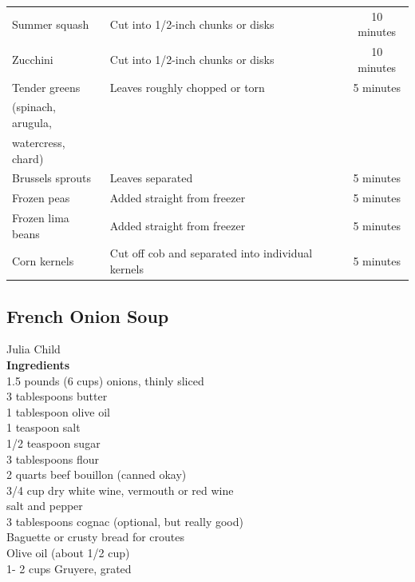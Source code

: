 \documentclass{article}
\numberwithin{figure}{section}
\numberwithin{equation}{section}
\begin{document}
\begin{table}[h!]
\begin{center}
\begin{tabular}{l|l|c}
      Summer squash & Cut into 1/2-inch chunks or disks	& 10 minutes\\
      Zucchini & Cut into 1/2-inch chunks or disks	& 10 minutes\\
      Tender greens	& Leaves roughly chopped or torn & 5 minutes\\ (spinach, arugula,&&\\ watercress, chard)&&\\
      Brussels sprouts & Leaves separated	 & 5 minutes\\
      Frozen peas & Added straight from freezer	& 5 minutes\\
      Frozen lima beans & Added straight from freezer	 & 5 minutes\\
      Corn kernels & Cut off cob and separated into individual kernels	& 5 minutes
    \end{tabular}
  \end{center}
\end{table}

\pagebreak
\subsection{French Onion Soup}
Julia Child\\

{\bf Ingredients}\\
1.5 pounds (6 cups) onions, thinly sliced\\
3 tablespoons  butter\\
1 tablespoon olive oil\\
1 teaspoon salt\\
1/2 teaspoon sugar\\
3 tablespoons flour\\
2 quarts  beef bouillon (canned okay)\\
3/4 cup dry white wine, vermouth or red wine\\
salt and pepper\\
3 tablespoons cognac (optional, but really good)\\
                        	
Baguette or crusty bread for croutes\\
Olive oil (about 1/2 cup)\\
1- 2 cups  Gruyere, grated\\
                        	
\end{document}
